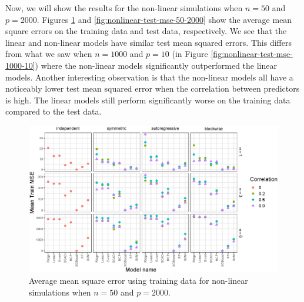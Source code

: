 \documentclass{article}
\begin{document}

	
	Now, we will show the results for the non-linear simulations when $n = 50$ and $p = 2000$. Figures \ref{fig:nonlinear-train-mse-50-2000} and \ref{fig:nonlinear-test-mse-50-2000} show the average mean square errors on the training data and test data, respectively. We see that the linear and non-linear models have similar test mean squared errors. This differs from what we saw when $n = 1000$ and $p = 10$ (in Figure \ref{fig:nonlinear-test-mse-1000-10}) where the non-linear models significantly outperformed the linear models. Another interesting observation is that the non-linear models all have a noticeably lower test mean squared error when the correlation between predictors is high. The linear models still perform significantly worse on the training data compared to the test data. 
	\begin{figure}[h!]
		\centering
		\includegraphics[width = \textwidth]{images/nonlinear-facet/train-mse/facet_train_mse_2_50_2000.eps}
		\captionsetup{width = 0.8\textwidth}
		\caption{Average mean square error using training data for non-linear simulations when $n = 50$ and $p = 2000$.}
		\label{fig:nonlinear-train-mse-50-2000}
	\end{figure}
	
\end{document}
